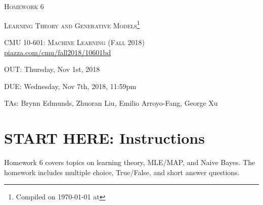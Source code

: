 \documentclass[12pt]{article}
\begin{document}
\section*{}
\begin{center}
  \centerline{\textsc{\LARGE  Homework 6}}
  \vspace{0.5em}
  \centerline{\textsc{\LARGE Learning Theory and Generative Models}\footnote{Compiled on \today{} at \currenttime{}}}
  \vspace{1em}
  \textsc{\large CMU 10-601: Machine Learning (Fall 2018)} \\
  \vspace{0.5em}
  \url{piazza.com/cmu/fall2018/10601bd} \\
  \vspace{0.5em}
  \centerline{OUT: Thursday, Nov 1st, 2018}
  \vspace{0.5em}
  \centerline{DUE: Wednesday, Nov 7th, 2018, 11:59pm}
    \centerline{TAs: Brynn Edmunds, Zhuoran Liu, Emilio Arroyo-Fang, George Xu}
\end{center}


\section*{START HERE: Instructions}

\begin{notebox}
Homework 6 covers topics on learning theory, MLE/MAP, and Naive Bayes. The homework includes multiple choice, True/False, and short answer questions. 
\end{notebox}
\end{document}
